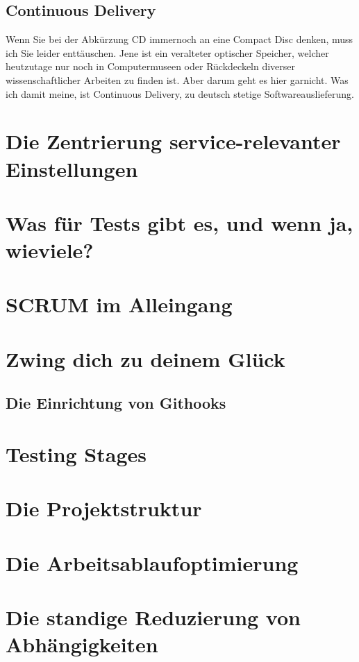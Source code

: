 \subsection{Continuous Delivery}
\label{subsec:continuous-delivery}
Wenn Sie bei der Abkürzung CD immernoch an eine Compact Disc denken, muss ich Sie leider enttäuschen. Jene ist ein veralteter optischer Speicher, welcher heutzutage nur noch in Computermuseen oder Rückdeckeln diverser wissenschaftlicher Arbeiten zu finden ist. Aber darum geht es hier garnicht. Was ich damit meine, ist Continuous Delivery, zu deutsch stetige Softwareauslieferung.


\section{Die Zentrierung service-relevanter Einstellungen}

\section{Was für Tests gibt es, und wenn ja, wieviele?}

\section{SCRUM im Alleingang}

\section{Zwing dich zu deinem Glück}

\subsection{Die Einrichtung von Githooks}
\section{Testing Stages}

\section{Die Projektstruktur}

\section{Die Arbeitsablaufoptimierung}

\section{Die standige Reduzierung von Abhängigkeiten}

